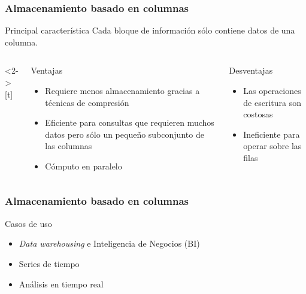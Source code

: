 \begin{frame}
    \frametitle{Almacenamiento basado en columnas}

    \begin{block}{Principal caracter\'istica}
        Cada bloque de informaci\'on s\'olo contiene datos de una columna.
    \end{block}

    \begin{columns}<2->[t]
\begin{exampleblock}{Ventajas}
    \begin{itemize}[<+(1)->]
        \item Requiere menos almacenamiento gracias a t\'ecnicas de compresi\'on
        \item Eficiente para consultas que requieren muchos datos pero s\'olo un peque\~no subconjunto de las columnas
        \item C\'omputo en paralelo
    \end{itemize}
\end{exampleblock}

\begin{alertblock}{Desventajas}
    \begin{itemize}[<+(1)->]
        \item Las operaciones de escritura son costosas
        \item Ineficiente para operar sobre las filas
    \end{itemize}
\end{alertblock}
    \end{columns}

\end{frame}

\begin{frame}
    \frametitle{Almacenamiento basado en columnas}

    \begin{block}{Casos de uso}
        \begin{itemize}[<+->]
            \item \textit{Data warehousing} e Inteligencia de Negocios (BI)
            \item Series de tiempo
            \item An\'alisis en tiempo real
        \end{itemize}
    \end{block}
\end{frame}